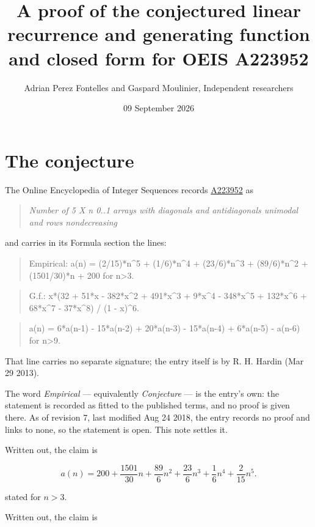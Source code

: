 \documentclass[11pt]{article}
\title{A proof of the conjectured linear recurrence and generating function and closed form for OEIS A223952}
\author{Adrian Perez Fontelles and Gaspard Moulinier, Independent researchers}
\date{09 September 2026}
\theoremstyle{definition}
\begin{document}
\maketitle
\section{The conjecture}

The Online Encyclopedia of Integer Sequences records \href{https://oeis.org/A223952}{A223952} as

\begin{quote}\itshape Number of 5 X n 0..1 arrays with diagonals and antidiagonals unimodal and rows nondecreasing\end{quote}

and carries in its Formula section the lines:

\begin{quote}\ttfamily Empirical: a(n) = (2/15)*n\textasciicircum{}5 + (1/6)*n\textasciicircum{}4 + (23/6)*n\textasciicircum{}3 + (89/6)*n\textasciicircum{}2 + (1501/30)*n + 200 for n>3.\end{quote}

\begin{quote}\ttfamily G.f.: x*(32 + 51*x - 382*x\textasciicircum{}2 + 491*x\textasciicircum{}3 + 9*x\textasciicircum{}4 - 348*x\textasciicircum{}5 + 132*x\textasciicircum{}6 + 68*x\textasciicircum{}7 - 37*x\textasciicircum{}8) / (1 - x)\textasciicircum{}6.\end{quote}

\begin{quote}\ttfamily a(n) = 6*a(n-1) - 15*a(n-2) + 20*a(n-3) - 15*a(n-4) + 6*a(n-5) - a(n-6) for n>9.\end{quote}

That line carries no separate signature; the entry itself is by R. H. Hardin (Mar 29 2013).

The word {\itshape Empirical} --- equivalently {\itshape Conjecture} --- is the entry's own: the statement is recorded as fitted to the published terms, and no proof is given there. As of revision 7, last modified Aug 24 2018, the entry records no proof and links to none, so the statement is open. This note settles it.

Written out, the claim is

\[a(n) = 200 + \frac{1501}{30}n + \frac{89}{6}n^{2} + \frac{23}{6}n^{3} + \frac{1}{6}n^{4} + \frac{2}{15}n^{5}.\]

stated for $n > 3$.

Written out, the claim is
\end{document}

